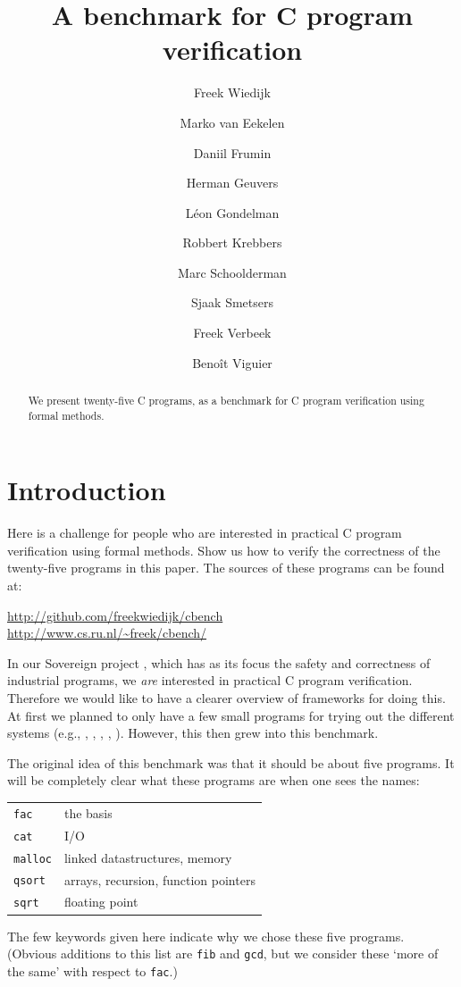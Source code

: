 \documentclass{article}
\begin{document}
\title{A benchmark for C program verification}
\author{Freek Wiedijk \and
Marko van Eekelen \and
Daniil Frumin \and
Herman Geuvers \and
L\'eon Gondelman \and
Robbert Krebbers \and
Marc Schoolderman \and
Sjaak Smetsers \and
Freek Verbeek \and
Beno\^it Viguier
}
\maketitle

\begin{abstract}
\noindent
We present twenty-five C programs, as a benchmark for
C program verification using formal methods.
\end{abstract}

\section{Introduction}

Here is a challenge for people who are interested in practical C program verification using formal methods.
Show us how to verify the correctness of the twenty-five programs in this paper.
The sources of these programs can be found at:
\begin{center}
\url{http://github.com/freekwiedijk/cbench} \\
\url{http://www.cs.ru.nl/~freek/cbench/} \\
\end{center}
In our Sovereign project \cite{eek:geu:sme:wie:14}, which has as its focus the safety and correctness of industrial programs, we \emph{are} interested in practical C program verification.
Therefore we would like to have a clearer overview of frameworks for doing this.
At first we planned to only have a few small programs for trying out the different systems (e.g., \cite{app:11}, \cite{cor:cuo:kir:mar:pre:puc:sig:yak:18}, \cite{dah:mos:san:tob:sch:09}, \cite{gre:and:klei:12}, \cite{jac:sma:phi:vog:pen:pie:11}).
However, this then grew into this benchmark.

The original idea of this benchmark was that it should be about five programs.
It will be completely clear what these programs are when one sees the names:
\begin{center}
\begin{tabular}{ll}
\lstinline|fac| & the basis \\
\lstinline|cat| & I/O \\
\lstinline|malloc| & linked datastructures, memory \\
\lstinline|qsort| & arrays, recursion, function pointers \\
\lstinline|sqrt| & floating point
\end{tabular}
\end{center}
The few keywords given here indicate why we chose these five programs.
(Obvious additions to this list are \texttt{fib} and \texttt{gcd}, but we consider these `more of the same'
with respect to \texttt{fac}.)
\end{document}
